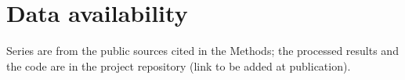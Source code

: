 \section*{Data availability}
Series are from the public sources cited in the Methods; the processed results and the code are in the project repository (link to be added at publication).
